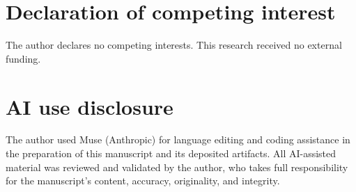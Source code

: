 \documentclass[11pt]{article}
\begin{document}
\section*{Declaration of competing interest}

The author declares no competing interests. This research received no
external funding.

\section*{AI use disclosure}

The author used Muse (Anthropic) for language editing and coding
assistance in the preparation of this manuscript and its deposited
artifacts. All AI-assisted material was reviewed and validated by the
author, who takes full responsibility for the manuscript's content,
accuracy, originality, and integrity.
\end{document}
